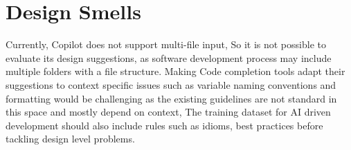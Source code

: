 \section{Design Smells}
Currently, Copilot does not support multi-file input, So it is not possible to evaluate its design suggestions, as software development process may include multiple folders with a file structure. 
Making Code completion tools adapt their suggestions to context specific issues such as variable naming conventions and formatting would be challenging as the existing guidelines are not standard in this space and mostly depend on context, The training dataset for AI driven development should also include rules such as idioms, best practices before tackling design level problems.
